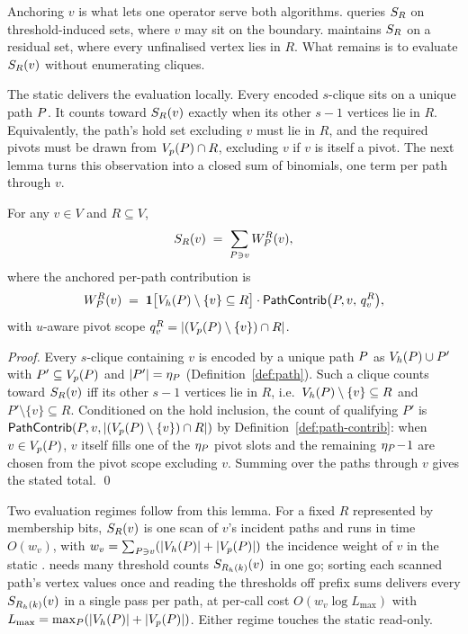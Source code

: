 Anchoring $v$ is what lets one operator serve both algorithms.
%
\spin{} queries $S_R$ on threshold-induced sets, where $v$ may sit on the boundary.
%
\spinStar{} maintains $S_R$ on a residual set, where every unfinalised vertex lies in $R$.
%
What remains is to evaluate $S_R(v)$ without enumerating cliques.

The static \cpi{} delivers the evaluation locally.
%
Every encoded $s$-clique sits on a unique path $\TPath$.
%
It counts toward $S_R(v)$ exactly when its other $s\!-\!1$ vertices lie in $R$.
%
Equivalently, the path's hold set excluding $v$ must lie in $R$, and the required pivots must be drawn from $\Vp(\TPath)\cap R$, excluding $v$ if $v$ is itself a pivot.
%
The next lemma turns this observation into a closed sum of binomials, one term per path through $v$.

\begin{lemma}\label{lem:set-support-eval}
For any $v\in V$ and $R\subseteq V$,
\[
  \setSup_R(v) \;=\; \sum_{\TPath\ni v} W_{\TPath}^{R}(v),
\]
where the anchored per-path contribution is
\[
  W_{\TPath}^{R}(v) \;=\; \mathbf{1}\bigl[\Vh(\TPath)\setminus\{v\}\subseteq R\bigr]\cdot\pathContrib\bigl(\TPath,v,\,q_v^R\bigr),
\]
with $u$-aware pivot scope $q_v^R=|(\Vp(\TPath)\setminus\{v\})\cap R|$.
\end{lemma}

\begin{proof}
Every $s$-clique containing $v$ is encoded by a unique path $\TPath$ as $\Vh(\TPath)\cup P'$ with $P'\subseteq\Vp(\TPath)$ and $|P'|=\eta_{\TPath}$ (Definition~\ref{def:path}).
%
Such a clique counts toward $S_R(v)$ iff its other $s\!-\!1$ vertices lie in $R$, i.e.\ $\Vh(\TPath)\setminus\{v\}\subseteq R$ and $P'\setminus\{v\}\subseteq R$.
%
Conditioned on the hold inclusion, the count of qualifying $P'$ is $\pathContrib(\TPath,v,|(\Vp(\TPath)\setminus\{v\})\cap R|)$ by Definition~\ref{def:path-contrib}: when $v\in\Vp(\TPath)$, $v$ itself fills one of the $\eta_{\TPath}$ pivot slots and the remaining $\eta_{\TPath}\!-\!1$ are chosen from the pivot scope excluding $v$.
%
Summing over the paths through $v$ gives the stated total.
%
\qed
\end{proof}

Two evaluation regimes follow from this lemma.
%
For a fixed $R$ represented by membership bits, $S_R(v)$ is one scan of $v$'s incident paths and runs in time $O(w_v)$, with $w_v=\sum_{\TPath\ni v}(|\Vh(\TPath)|+|\Vp(\TPath)|)$ the incidence weight of $v$ in the static \cpi{}.
%
\spin{} needs many threshold counts $S_{R_h(k)}(v)$ in one go; sorting each scanned path's vertex values once and reading the thresholds off prefix sums delivers every $S_{R_h(k)}(v)$ in a single pass per path, at per-call cost $O(w_v\log L_{\max})$ with $L_{\max}=\max_{\TPath}(|\Vh(\TPath)|+|\Vp(\TPath)|)$.
%
Either regime touches the static \cpi{} read-only.

